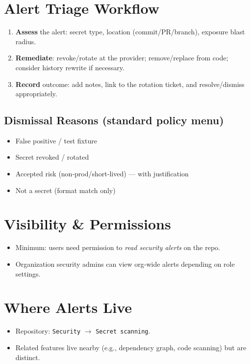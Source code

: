 \documentclass[11pt,a4paper]{article}
\newcommand{\kpi}[1]{\textbf{\textsf{#1}}}
\begin{document}
\section{Alert Triage Workflow}
\begin{enumerate}
  \item \kpi{Assess} the alert: secret type, location (commit/PR/branch), exposure blast radius.
  \item \kpi{Remediate}: revoke/rotate at the provider; remove/replace from code; consider history rewrite if necessary.
  \item \kpi{Record} outcome: add notes, link to the rotation ticket, and resolve/dismiss appropriately.
\end{enumerate}

\subsection*{Dismissal Reasons (standard policy menu)}
\begin{itemize}
  \item False positive / test fixture
  \item Secret revoked / rotated
  \item Accepted risk (non‑prod/short‑lived) — with justification
  \item Not a secret (format match only)
\end{itemize}

\section{Visibility \& Permissions}
\begin{itemize}
  \item Minimum: users need permission to \textit{read security alerts} on the repo.
  \item Organization security admins can view org‑wide alerts depending on role settings.
\end{itemize}

\section{Where Alerts Live}
\begin{itemize}
  \item Repository: \texttt{Security} $\rightarrow$ \texttt{Secret scanning}.
  \item Related features live nearby (e.g., dependency graph, code scanning) but are distinct.
\end{itemize}
\end{document}
